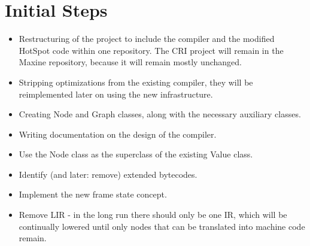 \section{Initial Steps}
\begin{itemize}
    \item Restructuring of the project to include the compiler and the modified HotSpot code within one repository. The CRI project will remain in the Maxine repository, because it will remain mostly unchanged.
    \item Stripping optimizations from the existing compiler, they will be reimplemented later on using the new infrastructure.
    \item Creating Node and Graph classes, along with the necessary auxiliary classes.
    \item Writing documentation on the design of the compiler.
    \item Use the Node class as the superclass of the existing Value class.
    \item Identify (and later: remove) extended bytecodes.
    \item Implement the new frame state concept.
    \item Remove LIR - in the long run there should only be one IR, which will be continually lowered until only nodes that can be translated into machine code remain.
\end{itemize}
